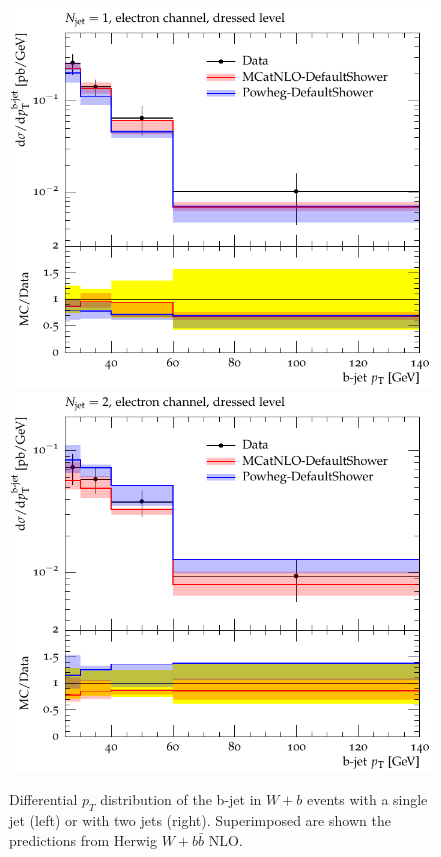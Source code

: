 \documentclass[11pt]{cernrep}
\newcommand{\pt}{\ensuremath{p_{T}}\xspace}
\begin{document}
\begin{figure}[htbp]
\begin{center}
   \includegraphics[scale=0.65]{figs/wbb/herwig/d02-x01-y02.pdf}
   \includegraphics[scale=0.65]{figs/wbb/herwig/d02-x02-y02.pdf}
\end{center}
\caption{Differential \pt distribution of the b-jet in $W+b$ events with a
  single jet (left) or with two jets (right). Superimposed are shown the
  predictions from Herwig $W+b\bar{b}$ NLO.}
\label{wbb-pt-herwig}
\end{figure}
\end{document}
